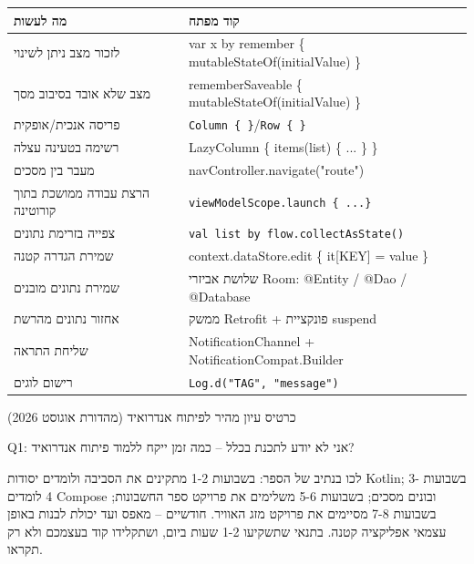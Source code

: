 


\begin{center}
\begin{tabularx}{\linewidth}{|X|X|}
\hline
\textbf{מה לעשות} & \textbf{קוד מפתח} \tabularnewline
\hline
לזכור מצב ניתן לשינוי & var x by remember \{ mutableStateOf(initialValue) \} \tabularnewline
מצב שלא אובד בסיבוב מסך & rememberSaveable \{ mutableStateOf(initialValue) \} \tabularnewline
פריסה אנכית/אופקית & \texttt{Column \{ \}}/\texttt{Row \{ \}} \tabularnewline
רשימה בטעינה עצלה & LazyColumn \{ items(list) \{ ... \} \} \tabularnewline
מעבר בין מסכים & navController.navigate("route") \tabularnewline
הרצת עבודה ממושכת בתוך קורוטינה & \texttt{viewModelScope.\allowbreak launch \{ .\allowbreak .\allowbreak .\allowbreak  \}} \tabularnewline
צפייה בזרימת נתונים & \texttt{val list by flow.\allowbreak collectAsState()} \tabularnewline
שמירת הגדרה קטנה & context.dataStore.edit \{ it[KEY] = value \} \tabularnewline
שמירת נתונים מובנים & שלושת אביזרי Room: ‏@Entity / @Dao / @Database \tabularnewline
אחזור נתונים מהרשת & ממשק Retrofit + פונקציית suspend \tabularnewline
שליחת התראה & NotificationChannel + NotificationCompat.Builder \tabularnewline
רישום לוגים & \texttt{Log.\allowbreak d("TAG", "message")} \tabularnewline
\hline
\end{tabularx}
\end{center}

\begin{center}\small\color{gray}כרטיס עיון מהיר לפיתוח אנדרואיד (מהדורת אוגוסט 2026)\end{center}


Q1: אני לא יודע לתכנת בכלל – כמה זמן ייקח ללמוד פיתוח אנדרואיד?

לכו בנתיב של הספר: בשבועות 1-2 מתקינים את הסביבה ולומדים יסודות Kotlin; בשבועות 3-4 לומדים Compose ובונים מסכים; בשבועות 5-6 משלימים את פרויקט ספר החשבונות; בשבועות 7-8 מסיימים את פרויקט מזג האוויר. חודשיים – מאפס ועד יכולת לבנות באופן עצמאי אפליקציה קטנה. בתנאי שתשקיעו 1-2 שעות ביום, ושתקלידו קוד בעצמכם ולא רק תקראו.

